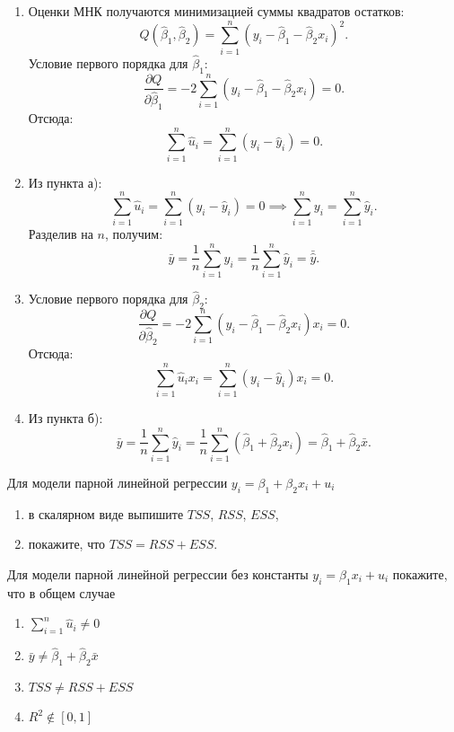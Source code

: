 \documentclass[12pt]{article}
\newcommand{\hb}{\hat{\beta}}
\newcommand{\hu}{\hat{u}}
\newcommand{\hy}{\hat{y}}
\newcommand{\RSS}{RSS}
\newcommand{\ESS}{ESS}
\newcommand{\TSS}{TSS}
\begin{document}
\begin{sol}
\begin{enumerate}
    \item Оценки МНК получаются минимизацией суммы квадратов остатков:
\[
Q(\hb_1, \hb_2) = \sum^n_{i=1} (y_i - \hb_1 - \hb_2 x_i)^2.
\]
Условие первого порядка для $\hb_1$:
\[
\frac{\partial Q}{\partial \hb_1} = -2 \sum^n_{i=1} (y_i - \hb_1 - \hb_2 x_i) = 0.
\]
Отсюда:
\[
\sum^n_{i=1} \hu_i = \sum^n_{i=1} (y_i - \hy_i) = 0.
\]

\item Из пункта а):
\[
\sum^n_{i=1} \hu_i = \sum^n_{i=1} (y_i - \hy_i) = 0 \implies \sum^n_{i=1} y_i = \sum^n_{i=1} \hy_i.
\]
Разделив на $n$, получим:
\[
\bar{y} = \frac{1}{n} \sum^n_{i=1} y_i = \frac{1}{n} \sum^n_{i=1} \hy_i = \bar{\hat{y}}.
\]
\item Условие первого порядка для $\hb_2$:
\[
\frac{\partial Q}{\partial \hb_2} = -2 \sum^n_{i=1} (y_i - \hb_1 - \hb_2 x_i) x_i = 0.
\]
Отсюда:
\[
\sum^n_{i=1} \hu_i x_i = \sum^n_{i=1} (y_i - \hy_i) x_i = 0.
\]

\item Из пункта б):
\[
\bar{y} = \frac{1}{n} \sum^n_{i=1} \hy_i = \frac{1}{n} \sum^n_{i=1} (\hb_1 + \hb_2 x_i) = \hb_1 + \hb_2 \bar{x}.
\]
\end{enumerate}
\end{sol}

\begin{problem}
    Для модели парной линейной регрессии  $y_i = \beta_1 + \beta_2 x_i + u_i$

    \begin{enumerate}
        \item в скалярном виде выпишите $\TSS$, $\RSS$, $\ESS$,
        \item покажите, что $\TSS = \RSS + \ESS$.
    \end{enumerate}
\end{problem}

\begin{problem}
    Для модели парной линейной регрессии без константы $y_i = \beta_1 x_i + u_i$ покажите, что в общем случае

    \begin{enumerate}
        \item $\sum^n_{i=1} \hu_i \neq 0$
        \item $\bar{y} \neq \hb_1 + \hb_2 \bar{x}$
        \item $\TSS \neq \RSS + \ESS$
        \item $R^2 \notin [0, 1]$
    \end{enumerate}
\end{problem}
\end{document}
